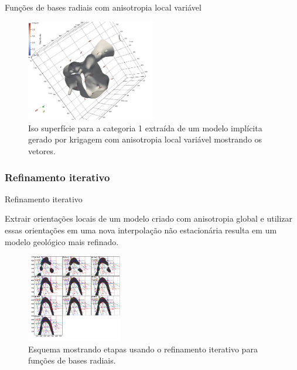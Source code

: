 \documentclass[aspectratio=169]{beamer}
\begin{document}
\begin{frame}{Funções de bases radiais com anisotropia local variável}
	\begin{figure}[H]
		\caption{\label{rbf_iterref}Iso superfície para a categoria 1 extraída de um modelo implícita gerado por krigagem com anisotropia local variável mostrando os vetores.}
		\begin{center}
			\includegraphics[width=0.5\textwidth]{capitulo_2/rbf_iterref.jpeg}
		\end{center}
	\end{figure}
\end{frame}

\subsubsection{Refinamento iterativo}

\begin{frame}{Refinamento iterativo}

Extrair orientações locais de um modelo criado com anisotropia global e utilizar essas orientações em uma nova interpolação não estacionária resulta em um modelo geológico mais refinado.

	\begin{figure}[H]
		\caption{\label{iterref} Esquema mostrando etapas usando o refinamento iterativo para funções de bases radiais.}
		\begin{center}
			\includegraphics[width=0.37\textwidth]{capitulo_2/iterref.jpg}
		\end{center}
	\end{figure}
\end{frame}
\end{document}
